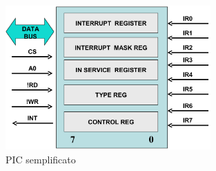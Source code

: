 

\begin{figure}[!ht]
    \centering
    \includegraphics[width=0.7\textwidth]{img/easy_pic.png}
    \caption{PIC semplificato}
    \label{img:piceasy}
\end{figure}

